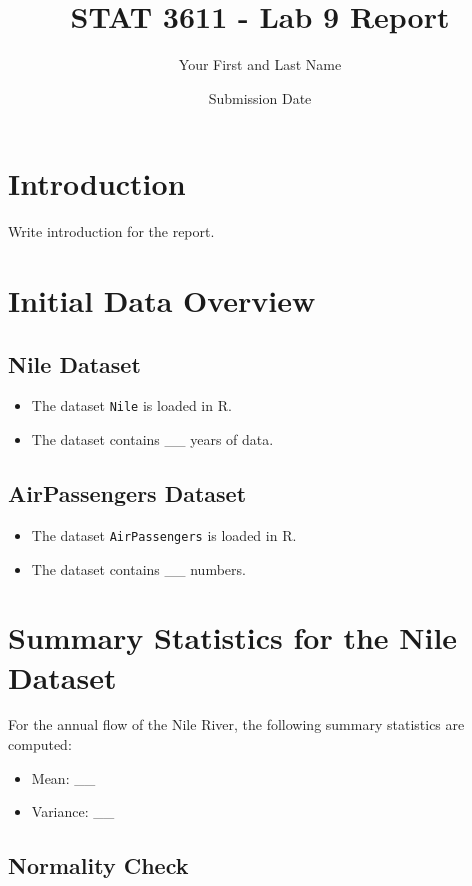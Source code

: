 \documentclass{article}
\title{STAT 3611 - Lab 9 Report}
\author{Your First and Last Name}
\date{Submission Date}
\begin{document}
\maketitle

\section{Introduction}

Write introduction for the report.

\section{Initial Data Overview}

\subsection{Nile Dataset}
\begin{itemize}
    \item The dataset \texttt{Nile} is loaded in R.
    \item The dataset contains \_\_ years of data.
\end{itemize}

\subsection{AirPassengers Dataset}
\begin{itemize}
    \item The dataset \texttt{AirPassengers} is loaded in R.
    \item The dataset contains \_\_ numbers.
\end{itemize}

\section{Summary Statistics for the Nile Dataset}

For the annual flow of the Nile River, the following summary statistics are computed:

\begin{itemize}
    \item Mean: \_\_
    \item Variance: \_\_
\end{itemize}

\subsection{Normality Check}
\end{document}
